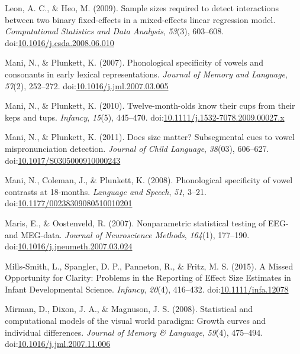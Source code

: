 \documentclass[man]{apa6}
\theoremstyle{definition}
\theoremstyle{definition}
\theoremstyle{definition}
\theoremstyle{remark}
\begin{document}
\hypertarget{ref-Leon2009}{}
Leon, A. C., \& Heo, M. (2009). Sample sizes required to detect
interactions between two binary fixed-effects in a mixed-effects linear
regression model. \emph{Computational Statistics and Data Analysis},
\emph{53}(3), 603--608.
doi:\href{https://doi.org/10.1016/j.csda.2008.06.010}{10.1016/j.csda.2008.06.010}

\hypertarget{ref-Mani2007}{}
Mani, N., \& Plunkett, K. (2007). Phonological specificity of vowels and
consonants in early lexical representations. \emph{Journal of Memory and
Language}, \emph{57}(2), 252--272.
doi:\href{https://doi.org/10.1016/j.jml.2007.03.005}{10.1016/j.jml.2007.03.005}

\hypertarget{ref-Mani2010kepstups}{}
Mani, N., \& Plunkett, K. (2010). Twelve-month-olds know their cups from
their keps and tups. \emph{Infancy}, \emph{15}(5), 445--470.
doi:\href{https://doi.org/10.1111/j.1532-7078.2009.00027.x}{10.1111/j.1532-7078.2009.00027.x}

\hypertarget{ref-Mani2011}{}
Mani, N., \& Plunkett, K. (2011). Does size matter? Subsegmental cues to
vowel mispronunciation detection. \emph{Journal of Child Language},
\emph{38}(03), 606--627.
doi:\href{https://doi.org/10.1017/S0305000910000243}{10.1017/S0305000910000243}

\hypertarget{ref-Mani2008}{}
Mani, N., Coleman, J., \& Plunkett, K. (2008). Phonological specificity
of vowel contrasts at 18-months. \emph{Language and Speech}, \emph{51},
3--21.
doi:\href{https://doi.org/10.1177/00238309080510010201}{10.1177/00238309080510010201}

\hypertarget{ref-Maris2007}{}
Maris, E., \& Oostenveld, R. (2007). Nonparametric statistical testing
of EEG- and MEG-data. \emph{Journal of Neuroscience Methods},
\emph{164}(1), 177--190.
doi:\href{https://doi.org/10.1016/j.jneumeth.2007.03.024}{10.1016/j.jneumeth.2007.03.024}

\hypertarget{ref-Mills-Smith2015}{}
Mills-Smith, L., Spangler, D. P., Panneton, R., \& Fritz, M. S. (2015).
A Missed Opportunity for Clarity: Problems in the Reporting of Effect
Size Estimates in Infant Developmental Science. \emph{Infancy},
\emph{20}(4), 416--432.
doi:\href{https://doi.org/10.1111/infa.12078}{10.1111/infa.12078}

\hypertarget{ref-Mirman2008}{}
Mirman, D., Dixon, J. A., \& Magnuson, J. S. (2008). Statistical and
computational models of the visual world paradigm: Growth curves and
individual differences. \emph{Journal of Memory \& Language},
\emph{59}(4), 475--494.
doi:\href{https://doi.org/10.1016/j.jml.2007.11.006}{10.1016/j.jml.2007.11.006}
\end{document}
